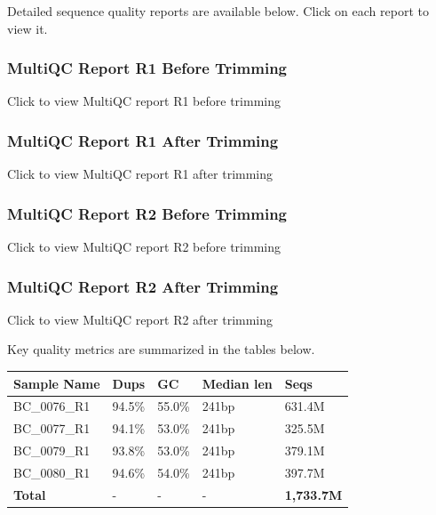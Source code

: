 \documentclass[
  11pt,
  a4paper,
]{report}
\begin{document}
Detailed sequence quality reports are available below. Click on each
report to view it.

\subsubsection{MultiQC Report R1 Before Trimming}

Click to view MultiQC report R1 before trimming

\subsubsection{MultiQC Report R1 After Trimming}

Click to view MultiQC report R1 after trimming

\subsubsection{MultiQC Report R2 Before Trimming}

Click to view MultiQC report R2 before trimming

\subsubsection{MultiQC Report R2 After Trimming}

Click to view MultiQC report R2 after trimming

Key quality metrics are summarized in the tables below.

\begin{table}

\caption{\label{tbl-example}Before trimming}

\begin{minipage}{\linewidth}

\begin{longtable}[]{@{}lllll@{}}
\toprule\noalign{}
Sample Name & Dups & GC & Median len & Seqs \\
\midrule\noalign{}
\endhead
\bottomrule\noalign{}
\endlastfoot
BC\_0076\_R1 & 94.5\% & 55.0\% & 241bp & 631.4M \\
BC\_0077\_R1 & 94.1\% & 53.0\% & 241bp & 325.5M \\
BC\_0079\_R1 & 93.8\% & 53.0\% & 241bp & 379.1M \\
BC\_0080\_R1 & 94.6\% & 54.0\% & 241bp & 397.7M \\
\textbf{Total} & - & - & - & \textbf{1,733.7M} \\
\end{longtable}

\end{minipage}%

\end{table}%
\end{document}

